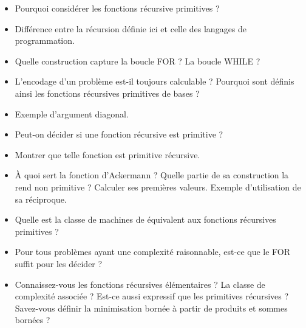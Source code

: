 \documentclass{agregfiche}
\begin{document}
\begin{itemize}
	\item Pourquoi considérer les fonctions récursive primitives ? %
	\item Différence entre la récursion définie ici et celle des langages de programmation.
        \item Quelle construction capture la boucle FOR ? La boucle WHILE
          ?
	\item L'encodage d'un problème est-il toujours calculable ?
          Pourquoi sont définis ainsi les fonctions récursives primitives
          de bases ?
	\item Exemple d'argument diagonal.
    \item Peut-on décider si une fonction récursive est primitive ?
	\item Montrer que telle fonction est primitive récursive.
    \item À quoi sert la fonction d'Ackermann ?  Quelle partie de sa
    construction la rend non primitive ? Calculer ses premières
    valeurs. Exemple d'utilisation de sa
    réciproque.
    \item Quelle est la classe de machines de  équivalent
    aux fonctions récursives primitives ? %
    \item Pour tous problèmes ayant une complexité raisonnable,
      est-ce que le FOR suffit pour les décider ?

      \item Connaissez-vous les fonctions récursives élémentaires ?
      La
      classe de complexité associée ? Est-ce aussi expressif que les
      primitives récursives ?
      Savez-vous définir la minimisation bornée à partir de produits
      et sommes bornées ?

\end{itemize}
\end{document}
